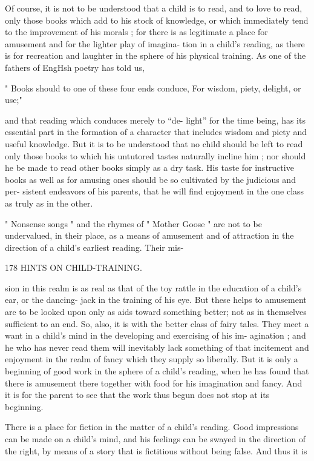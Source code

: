 \documentclass[
]{book}
\begin{document}
Of course, it is not to be understood that a child is to read, and to love to read, only those books which add to his stock of knowledge, or which immediately tend to the improvement of his morals ; for there is as legitimate a place for amusement and for the lighter play of imagina- tion in a child's reading, as there is for recreation and laughter in the sphere of his physical training. As one of the fathers of EngHsh poetry has told us,

" Books should to one of these four ends conduce, For wisdom, piety, delight, or use;"

and that reading which conduces merely to ``de- light'' for the time being, has its essential part in the formation of a character that includes wisdom and piety and useful knowledge. But it is to be understood that no child should be left to read only those books to which his untutored tastes naturally incline him ; nor should he be made to read other books simply as a dry task. His taste for instructive books as well as for amusing ones should be so cultivated by the judicious and per- sistent endeavors of his parents, that he will find enjoyment in the one class as truly as in the other.

" Nonsense songs " and the rhymes of " Mother Goose " are not to be undervalued, in their place, as a means of amusement and of attraction in the direction of a child's earliest reading. Their mis-

178 HINTS ON CHILD-TRAINING.

sion in this realm is as real as that of the toy rattle in the education of a child's ear, or the dancing- jack in the training of his eye. But these helps to amusement are to be looked upon only as aids toward something better; not as in themselves sufficient to an end. So, also, it is with the better class of fairy tales. They meet a want in a child's mind in the developing and exercising of his im- agination ; and he who has never read them will inevitably lack something of that incitement and enjoyment in the realm of fancy which they supply so liberally. But it is only a beginning of good work in the sphere of a child's reading, when he has found that there is amusement there together with food for his imagination and fancy. And it is for the parent to see that the work thus begun does not stop at its beginning.

There is a place for fiction in the matter of a child's reading. Good impressions can be made on a child's mind, and his feelings can be swayed in the direction of the right, by means of a story that is fictitious without being false. And thus it is
\end{document}
